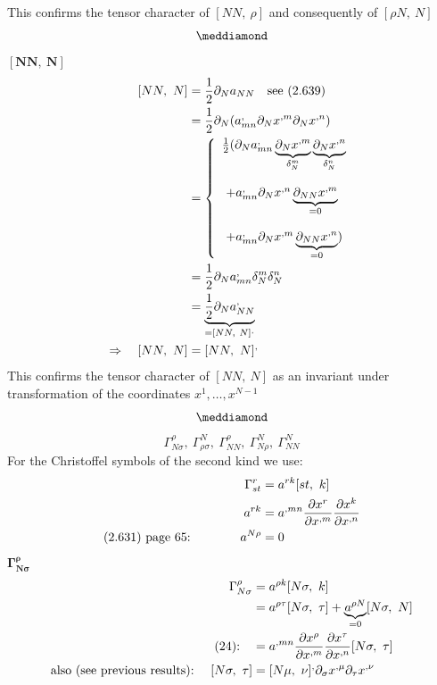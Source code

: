 This confirms the tensor character of $[ NN, \ \rho ] $ and consequently of $[\rho N, \ N ]$
$$\meddiamond$$
\newpage
$\boldsymbol{[NN, \ N ] }$\\
\begin{align}
\ [ NN, \ N ] &= \frac{1}{2} \partial_{N} a_{NN}\quad \text{see (2.639)}\\
\ &= \frac{1}{2} \partial_{N} (a^{,}_{mn}\partial_{N}x^{,m}\partial_{N}x^{,n})\\
\ & = \left\{ \begin{array}{l}
\frac{1}{2} (\partial_{N} a^{,}_{mn}\underbrace{\partial_{N}x^{,m}}_{\delta^m_N}\underbrace{\partial_{N}x^{,n}}_{\delta^n_N}\\\\
\ + a^{,}_{mn} \partial_{N}x^{,n} \underbrace{\partial_{N N}x^{,m}}_{=0}\\\\
\ + a^{,}_{mn} \partial_{N}x^{,m} \underbrace{\partial_{N N}x^{,n}}_{=0})
\end{array} \right.\\
\ &= \frac{1}{2} \partial_{N} a^{,}_{mn}\delta^m_N\delta^n_N\\
\ &=  \underbrace{\frac{1}{2} \partial_{N} a^{,}_{NN}}_{=[ NN, \ N ]^,} \\
\Rightarrow \quad [ NN, \ N ] &=  [ NN, \ N ]^,
\end{align}
This confirms the tensor character of $[ NN, \ N ] $ as an invariant under transformation of the coordinates $x^1, \dots , x^{N-1}$
$$\meddiamond$$
$$\Gamma^{\rho}_{N \sigma},\ \Gamma^{N}_{\rho \sigma},\ \Gamma^{\rho}_{N N}, \ \Gamma^{N}_{N \rho}, \ \Gamma^{N}_{N N}$$
For the Christoffel symbols of the second kind we use:
\begin{align}
\Gamma^r_{st} &= a^{rk}[st,\ k]\\
\ a^{rk} &= a^{,mn}\pdv{x^r}{x^{,m}}\pdv{x^k}{x^{,n}}\\
 \text{(2.631) page 65:}\quad\quad\quad\quad a^{N \rho} &= 0 
\end{align}
\newpage
$\boldsymbol{\Gamma^{\rho}_{N \sigma}}$\\
\begin{align}
\Gamma^{\rho}_{N \sigma} &= a^{\rho k}[N \sigma,\ k]\\
\ & = a^{\rho \tau}[N \sigma,\ \tau]+ \underbrace{a^{\rho N}}_{=0}[N \sigma,\ N]\\
\text{(24):}\quad &= a^{,mn}\pdv{x^{\rho}}{x^{,m}}\pdv{x^{\tau}}{x^{,n}}[N \sigma,\ \tau]\\
\text{also (see previous results):}\quad \ [N \sigma,\ \tau] &= [ N \mu, \ \nu]^{,}\partial_{\sigma}x^{,\mu}\partial_{\tau}x^{,\nu}
\end{align}
